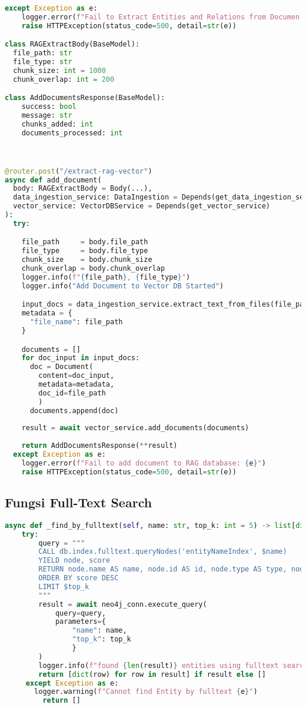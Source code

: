 \begin{lstlisting}[numbers=none, language=python]
  except Exception as e:
    logger.error(f"Fail to Extract Entities and Relations from Documen {body.file_path} : {str(e)}")
    raise HTTPException(status_code=500, detail=str(e))

class RAGExtractBody(BaseModel):
  file_path: str
  file_type: str
  chunk_size: int = 1000
  chunk_overlap: int = 200

class AddDocumentsResponse(BaseModel):
    success: bool
    message: str
    chunks_added: int
    documents_processed: int



@router.post("/extract-rag-vector")
async def add_document(
  body: RAGExtractBody = Body(...),
  data_ingestion_service: DataIngestion = Depends(get_data_ingestion_service),
  vector_service: VectorDBService = Depends(get_vector_service)
):
  try:

    file_path     = body.file_path
    file_type     = body.file_type
    chunk_size    = body.chunk_size
    chunk_overlap = body.chunk_overlap
    logger.info(f"{file_path}, {file_type}")
    logger.info("Add Document to Vector DB Started")

    input_docs = data_ingestion_service.extract_text_from_files(file_path=file_path, type=file_type, split=False)
    metadata = {
      "file_name": file_path
    }

    documents = []
    for doc_input in input_docs:
      doc = Document(
        content=doc_input,
        metadata=metadata,
        doc_id=file_path
        )
      documents.append(doc)
        
    result = await vector_service.add_documents(documents)
        
    return AddDocumentsResponse(**result)
  except Exception as e:
    logger.error(f"Fail to add document to RAG database: {e}")
    raise HTTPException(status_code=500, detail=str(e))
\end{lstlisting}
\subsection{Fungsi Full-Text Search}
\begin{lstlisting}[numbers=none, language=python]
async def _find_by_fulltext(self, name: str, top_k: int = 5) -> list[dict]:
    try:
        query = """
        CALL db.index.fulltext.queryNodes('entityNameIndex', $name)
        YIELD node, score
        RETURN node.name AS name, node.id AS id, node.type AS type, node.description AS description, score
        ORDER BY score DESC
        LIMIT $top_k
        """
        result = await neo4j_conn.execute_query(
            query=query, 
            parameters={
                "name": name,
                "top_k": top_k
                }
        )
        logger.info(f"found {len(result)} entities using fulltext search")
        return [dict(row) for row in result] if result else []
     except Exception as e:
       logger.warning(f"Cannot find Entity by fulltext {e}")
         return []
\end{lstlisting}
